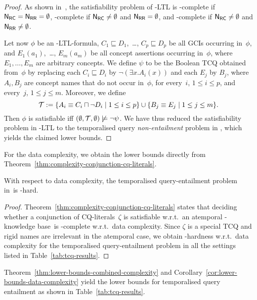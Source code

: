 \begin{proof}
    As shown in~\cite{BaGL-ToCL12}, the satisfiability problem of \ALC-LTL is
    \ExpTime-complete if $\mathsf{N_{RC}}=\mathsf{N_{RR}}=\emptyset$, \NExpTime-complete if
    $\mathsf{N_{RC}}\ne\emptyset$ and $\mathsf{N_{RR}}=\emptyset$, and \TwoExpTime-complete if
    $\mathsf{N_{RC}}\ne\emptyset$ and $\mathsf{N_{RR}}\ne\emptyset$.

    Let now $\phi$ be an \ALC-LTL-formula, $C_1\sqsubseteq D_1$,~\dots,
    $C_p\sqsubseteq D_p$ be all GCIs occurring in~$\phi$, and $E_1(a_1)$,~\dots,
    $E_m(a_m)$ be all concept assertions occurring in~$\phi$, where
    $E_1,\dots,E_m$ are arbitrary concepts.
    We define $\psi$ to be the Boolean TCQ obtained from~$\phi$ by replacing
    each $C_i\sqsubseteq D_i$ by $\lnot(\exists x.A_i(x))$ and each $E_j$ by
    $B_j$, where $A_i,B_j$ are concept names that do not occur in~$\phi$, for
    every~$i$, $1\le i\le p$, and every~$j$, $1\le j\le m$.
    Moreover, we define
    \[\Tmc:=\{A_i\equiv C_i\sqcap\lnot D_i\mid 1\leq i\leq p\}\cup%
        \{B_j\equiv E_j\mid 1\leq j\leq m\}.\]
    Then $\phi$ is satisfiable iff
    $(\emptyset,\mathcal{T},\emptyset)\not\models\lnot\psi$.
    We have thus reduced the satisfiability problem in \ALC-LTL to the
    temporalised query \emph{non-entailment} problem in \ALC, which yields the
    claimed lower bounds.
\end{proof}

\noindent
For the data complexity, we obtain the lower bounds directly from
Theorem~\ref{thm:complexity-conjunction-cq-literals}.

\begin{corollary}\label{cor:lower-bounds-data-complexity}
    With respect to data complexity, the temporalised query-entailment problem
    in~\ALC is \coNP-hard.
\end{corollary}

\begin{proof}
    Theorem~\ref{thm:complexity-conjunction-cq-literals} states that deciding
    whether a conjunction of CQ-literals~$\zeta$ is satisfiable w.r.t.\ an
    atemporal \ALC-knowledge base~\Kmc is \NP-complete w.r.t.\ data complexity.
    Since $\zeta$ is a special TCQ and rigid names are irrelevant in the
    atemporal case, we obtain \coNP-hardness w.r.t.\ data complexity for the
    temporalised query-entailment problem in all the settings listed in
    Table~\ref{tab:tcq-results}.
\end{proof}

\noindent
Theorem~\ref{thm:lower-bounds-combined-complexity} and
Corollary~\ref{cor:lower-bounds-data-complexity} yield the lower bounds for
temporalised query entailment as shown in Table~\ref{tab:tcq-results}.


